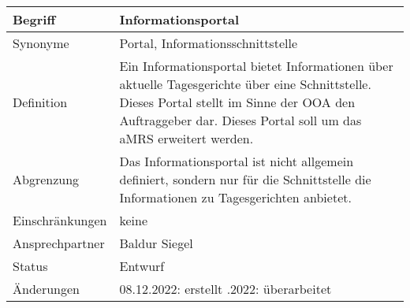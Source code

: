 \begin{table}[H]
    \centering
    \label{gls:informationsportal}
    \begin{tabularx}{\textwidth}{| l | X |}
        \hline
        Begriff         & Informationsportal                                                                                                                                                                                            \\
        \hline
        Synonyme        & Portal, Informationsschnittstelle                                                                                                                                                                             \\
        \hline
        Definition      & Ein Informationsportal bietet Informationen über aktuelle Tagesgerichte über eine Schnittstelle. Dieses Portal stellt im Sinne der OOA den Auftraggeber dar. Dieses Portal soll um das aMRS erweitert werden. \\
        \hline
        Abgrenzung      & Das Informationsportal ist nicht allgemein definiert, sondern nur für die Schnittstelle die Informationen zu Tagesgerichten anbietet.                                                                         \\
        \hline
        Einschränkungen & keine                                                                                                                                                                                                         \\
        \hline
        Ansprechpartner & Baldur Siegel                                                                                                                                                                                                 \\
        \hline
        Status          & Entwurf                                                                                                                                                                                                       \\
        \hline
        Änderungen      & 08.12.2022: erstellt
        \newline 16.12.2022: überarbeitet                                                                                                                                                                                               \\
        \hline
    \end{tabularx}
\end{table}



